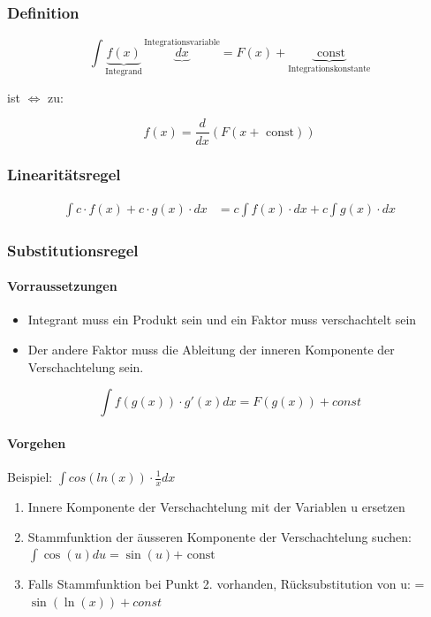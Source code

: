 \subsubsection{Definition}
\[
\int \underbrace{f(x)}_{{\text{Integrand}}}\, \underbrace{dx}^{{\text{Integrationsvariable}}} = F(x) + \underbrace{\text{ const}}_{{\text{Integrationskonstante}}}
\]

ist $\Leftrightarrow$ zu:

\[
f(x) = \frac{d}{dx}(F(x + \text{ const}))
\]

\subsubsection{Linearitätsregel}
\begin{align}
\int c \cdot f(x) + c \cdot g(x) \cdot dx &= c\int f(x) \cdot dx + c \int g(x) \cdot dx
\end{align}
\subsubsection{Substitutionsregel}
\paragraph{Vorraussetzungen}
\begin{itemize}
	\item Integrant muss ein Produkt sein und ein Faktor muss verschachtelt sein
	\item Der andere Faktor muss die Ableitung der inneren Komponente der Verschachtelung sein.
\end{itemize}
\[
\int f(g(x)) \cdot g'(x) dx = F(g(x)) + const
\]

\paragraph{Vorgehen}
Beispiel: $\int cos(ln(x)) \cdot \frac{1}{x} dx$

\begin{enumerate}
	\item Innere Komponente der Verschachtelung mit der Variablen u ersetzen
	\item Stammfunktion der äusseren Komponente der Verschachtelung suchen: $\int \cos(u) du = \sin(u) \text{+ const}$
	\item Falls Stammfunktion bei Punkt 2. vorhanden, Rücksubstitution von u: = \underline{\underline{$\sin(\ln(x)) + const $}}
\end{enumerate}

